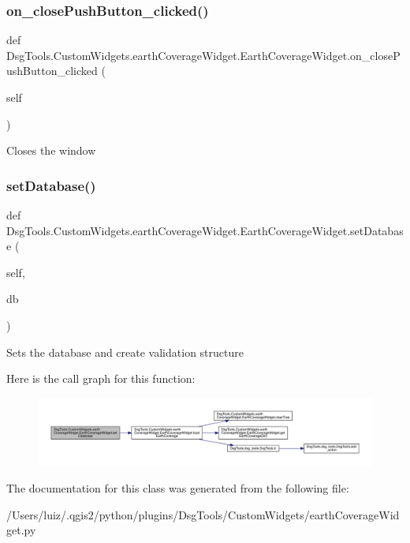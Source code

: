 \subsubsection{\texorpdfstring{on\+\_\+close\+Push\+Button\+\_\+clicked()}{on\_closePushButton\_clicked()}}
{\footnotesize\ttfamily def Dsg\+Tools.\+Custom\+Widgets.\+earth\+Coverage\+Widget.\+Earth\+Coverage\+Widget.\+on\+\_\+close\+Push\+Button\+\_\+clicked (\begin{DoxyParamCaption}\item[{}]{self }\end{DoxyParamCaption})}

\begin{DoxyVerb}Closes the window
\end{DoxyVerb}
 \mbox{\label{class_dsg_tools_1_1_custom_widgets_1_1earth_coverage_widget_1_1_earth_coverage_widget_a2c3d961e820803bc1ac33bad89d0c189}} 
\subsubsection{\texorpdfstring{set\+Database()}{setDatabase()}}
{\footnotesize\ttfamily def Dsg\+Tools.\+Custom\+Widgets.\+earth\+Coverage\+Widget.\+Earth\+Coverage\+Widget.\+set\+Database (\begin{DoxyParamCaption}\item[{}]{self,  }\item[{}]{db }\end{DoxyParamCaption})}

\begin{DoxyVerb}Sets the database and create validation structure
\end{DoxyVerb}
 Here is the call graph for this function\+:
\nopagebreak
\begin{figure}[H]
\begin{center}
\leavevmode
\includegraphics[width=350pt]{class_dsg_tools_1_1_custom_widgets_1_1earth_coverage_widget_1_1_earth_coverage_widget_a2c3d961e820803bc1ac33bad89d0c189_cgraph}
\end{center}
\end{figure}


The documentation for this class was generated from the following file\+:\begin{DoxyCompactItemize}
\item 
/\+Users/luiz/.\+qgis2/python/plugins/\+Dsg\+Tools/\+Custom\+Widgets/earth\+Coverage\+Widget.\+py\end{DoxyCompactItemize}
